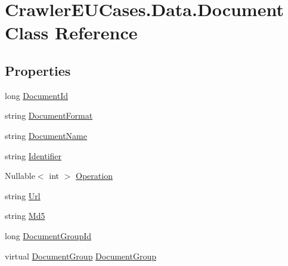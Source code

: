 \hypertarget{class_crawler_e_u_cases_1_1_data_1_1_document}{\section{Crawler\-E\-U\-Cases.\-Data.\-Document Class Reference}
\label{class_crawler_e_u_cases_1_1_data_1_1_document}
}
\subsection*{Properties}
\begin{DoxyCompactItemize}
\item 
long \hyperlink{class_crawler_e_u_cases_1_1_data_1_1_document_a48d2eb48a8436f0e7c05f38962c86914}{Document\-Id}
\item 
string \hyperlink{class_crawler_e_u_cases_1_1_data_1_1_document_a0b4973aa5ee3b71d0d6158a8f8b4f555}{Document\-Format}
\item 
string \hyperlink{class_crawler_e_u_cases_1_1_data_1_1_document_a441736365cf3672a57b2b6941c14ff7f}{Document\-Name}
\item 
string \hyperlink{class_crawler_e_u_cases_1_1_data_1_1_document_aa07db40c3320fef4ae06927ba1378900}{Identifier}
\item 
Nullable$<$ int $>$ \hyperlink{class_crawler_e_u_cases_1_1_data_1_1_document_a5bfe55294b3fec7c4f3c894bcf17b140}{Operation}
\item 
string \hyperlink{class_crawler_e_u_cases_1_1_data_1_1_document_ace21c0c53519fa84fc6011924ae1f4ee}{Url}
\item 
string \hyperlink{class_crawler_e_u_cases_1_1_data_1_1_document_a964a91276697fc6a4faa214ecbd17cbd}{Md5}
\item 
long \hyperlink{class_crawler_e_u_cases_1_1_data_1_1_document_a5187def17fb254ed148e98d07edb5aae}{Document\-Group\-Id}
\item 
virtual \hyperlink{class_crawler_e_u_cases_1_1_data_1_1_document_group}{Document\-Group} \hyperlink{class_crawler_e_u_cases_1_1_data_1_1_document_af3272877bc79053c846ce088a15e50e4}{Document\-Group}
\end{DoxyCompactItemize}


